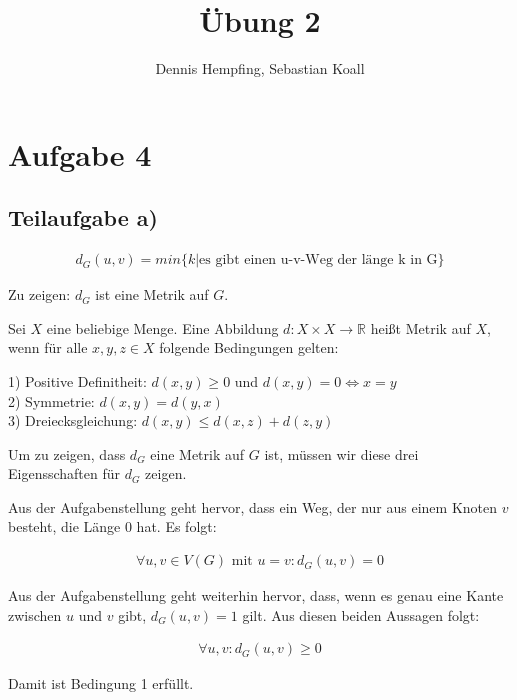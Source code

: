 \documentclass[12pt]{scrartcl}%
\theoremstyle{nonumberplain}
\newcommand{\R}{\mathbb{R}}
\begin{document}
\author{Dennis Hempfing, Sebastian Koall}
\title{Übung 2}
\date{} 
\pagestyle{myheadings}

\maketitle %
 
\section*{Aufgabe 4}

\subsection*{Teilaufgabe a)}

\begin{align*}
	d_G(u,v) = min\{k | \text{es gibt einen u-v-Weg der länge k in G}\}
\end{align*}

Zu zeigen: $d_G$ ist eine Metrik auf $G$.

Sei $X$ eine beliebige Menge. Eine Abbildung $d: X \times X \rightarrow \R$ heißt Metrik auf $X$, wenn für alle $x,y,z \in X$ folgende Bedingungen gelten:

1) Positive Definitheit: $d(x,y) \ge 0$ und $d(x,y) = 0 \Leftrightarrow x = y $ \\
2) Symmetrie: $d(x,y) = d(y,x)$ \\
3) Dreiecksgleichung: $d(x,y) \le d(x,z) + d(z,y)$

Um zu zeigen, dass $d_G$ eine Metrik auf $G$ ist, müssen wir diese drei Eigensschaften für $d_G$ zeigen.

Aus der Aufgabenstellung geht hervor, dass ein Weg, der nur aus einem Knoten $v$ besteht, die Länge $0$ hat. Es folgt:

\begin{align*}
	\forall u,v \in V(G)\text{ mit } u=v: d_G(u,v) = 0
\end{align*}

Aus der Aufgabenstellung geht weiterhin hervor, dass, wenn es genau eine Kante zwischen $u$ und $v$ gibt, $d_G(u,v) = 1$ gilt.  Aus diesen beiden Aussagen folgt:

\begin{align*}
	\forall u,v: d_G(u,v) \ge 0
\end{align*}

Damit ist Bedingung 1 erfüllt.
\end{document}
